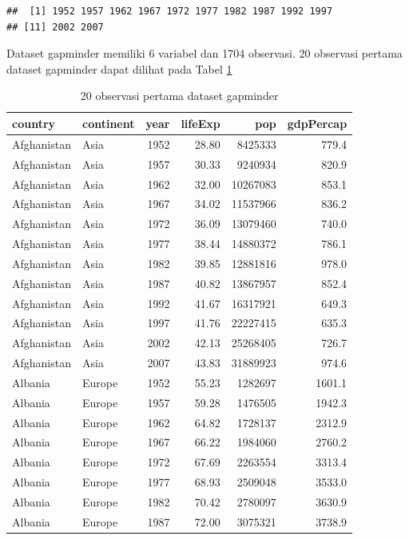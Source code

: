 \documentclass[]{book}
\begin{document}
\begin{verbatim}
##  [1] 1952 1957 1962 1967 1972 1977 1982 1987 1992 1997
## [11] 2002 2007
\end{verbatim}

Dataset gapminder memiliki 6 variabel dan 1704 observasi. 20 observasi
pertama dataset gapminder dapat dilihat pada Tabel \ref{tab:gapminder}

\begin{table}[t]

\caption{\label{tab:gapminder}20 observasi pertama dataset gapminder}
\centering
\begin{tabular}{l|l|r|r|r|r}
\hline
country & continent & year & lifeExp & pop & gdpPercap\\
\hline
Afghanistan & Asia & 1952 & 28.80 & 8425333 & 779.4\\
\hline
Afghanistan & Asia & 1957 & 30.33 & 9240934 & 820.9\\
\hline
Afghanistan & Asia & 1962 & 32.00 & 10267083 & 853.1\\
\hline
Afghanistan & Asia & 1967 & 34.02 & 11537966 & 836.2\\
\hline
Afghanistan & Asia & 1972 & 36.09 & 13079460 & 740.0\\
\hline
Afghanistan & Asia & 1977 & 38.44 & 14880372 & 786.1\\
\hline
Afghanistan & Asia & 1982 & 39.85 & 12881816 & 978.0\\
\hline
Afghanistan & Asia & 1987 & 40.82 & 13867957 & 852.4\\
\hline
Afghanistan & Asia & 1992 & 41.67 & 16317921 & 649.3\\
\hline
Afghanistan & Asia & 1997 & 41.76 & 22227415 & 635.3\\
\hline
Afghanistan & Asia & 2002 & 42.13 & 25268405 & 726.7\\
\hline
Afghanistan & Asia & 2007 & 43.83 & 31889923 & 974.6\\
\hline
Albania & Europe & 1952 & 55.23 & 1282697 & 1601.1\\
\hline
Albania & Europe & 1957 & 59.28 & 1476505 & 1942.3\\
\hline
Albania & Europe & 1962 & 64.82 & 1728137 & 2312.9\\
\hline
Albania & Europe & 1967 & 66.22 & 1984060 & 2760.2\\
\hline
Albania & Europe & 1972 & 67.69 & 2263554 & 3313.4\\
\hline
Albania & Europe & 1977 & 68.93 & 2509048 & 3533.0\\
\hline
Albania & Europe & 1982 & 70.42 & 2780097 & 3630.9\\
\hline
Albania & Europe & 1987 & 72.00 & 3075321 & 3738.9\\
\hline
\end{tabular}
\end{table}
\end{document}

